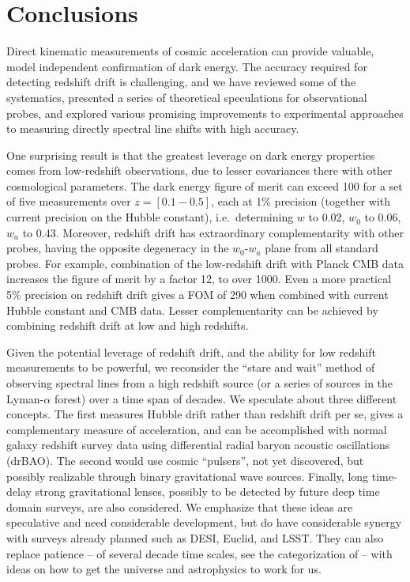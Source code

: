 \documentclass[preprint2, 10pt]{aastex}
\begin{document}
\section{Conclusions} \label{sec:concl} 

Direct kinematic measurements of cosmic acceleration can provide valuable, 
model independent confirmation of dark energy. The accuracy required for 
detecting redshift drift is challenging, and we have reviewed some of the 
systematics, presented a series of theoretical speculations for observational 
probes, and explored various promising improvements to experimental 
approaches to measuring directly spectral line shifts with high accuracy.  

One surprising result is that the greatest leverage on dark energy properties 
comes from low-redshift observations, due to lesser covariances there with 
other cosmological parameters. The dark energy figure of merit can exceed 
100 for a set of five measurements over $z=[0.1-0.5]$, each at 1\% precision 
(together with current precision on the Hubble constant), i.e.\ determining 
$w$ to 0.02, $w_0$ to 0.06, $w_a$ to 0.43. Moreover, redshift drift 
has extraordinary complementarity with other probes, having the opposite 
degeneracy in the $w_0$-$w_a$ plane from all standard probes. For example, 
combination of the low-redshift drift with Planck CMB data increases 
the figure of merit by a factor 12, to over 1000. Even a more practical 
5\% precision on redshift drift gives a FOM of 290 when combined with 
current Hubble constant and CMB data. Lesser complementarity can be achieved 
by combining redshift drift at low and high redshifts. 

Given the potential leverage of redshift drift, and the ability for low 
redshift measurements to be powerful, we reconsider the ``stare and wait'' 
method of observing spectral lines from a high redshift source (or a 
series of sources in the Lyman-$\alpha$ forest) over a time span of decades. 
We speculate about three different concepts. The first measures Hubble drift 
rather than redshift drift per se, gives a complementary measure of 
acceleration, and can be accomplished with normal galaxy redshift survey 
data using differential radial baryon acoustic oscillations (drBAO). 
The second would use cosmic ``pulsers'', not yet discovered, but possibly 
realizable through binary gravitational wave sources. Finally, long time-delay
strong gravitational lenses, possibly to be detected by future deep 
time domain surveys, are also considered. We emphasize that these ideas 
are speculative and need considerable development, but do have considerable 
synergy with surveys already planned such as DESI, Euclid, and LSST.  They 
can also replace patience -- of several decade time scales, see the 
categorization of \citet{stebbins} -- with ideas on how to get the universe 
and astrophysics to work for us. 
\end{document}
